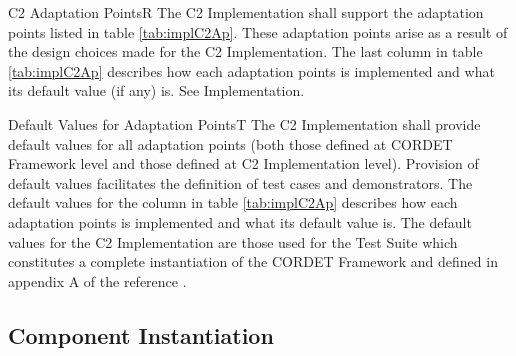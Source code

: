 \documentclass{pnp_article}
\begin{document}
\begin{fwReq}{C2 Adaptation Points}{R}
{The C2 Implementation shall support the adaptation points listed in table \ref{tab:implC2Ap}.}
{These adaptation points arise as a result of the design choices made for the C2 Implementation.}
{The last column in table \ref{tab:implC2Ap} describes how each adaptation points is implemented and what its default value (if any) is. } 
{See Implementation.}
\end{fwReq}


\begin{fwReq}{Default Values for Adaptation Points}{T}
{The C2 Implementation shall provide default values for all adaptation points (both those defined at CORDET Framework level and those defined at C2 Implementation level).}
{Provision of default values facilitates the definition of test cases and demonstrators.}
{The default values for the  column in table \ref{tab:implC2Ap} describes how each adaptation points is implemented and what its default value is. } 
{The default values for the C2 Implementation are those used for the Test Suite which constitutes a complete instantiation of the CORDET Framework and defined in appendix A of the reference \cite{ref:C2Implementation}.}
\end{fwReq}


\subsection{Component Instantiation}
\end{document}
